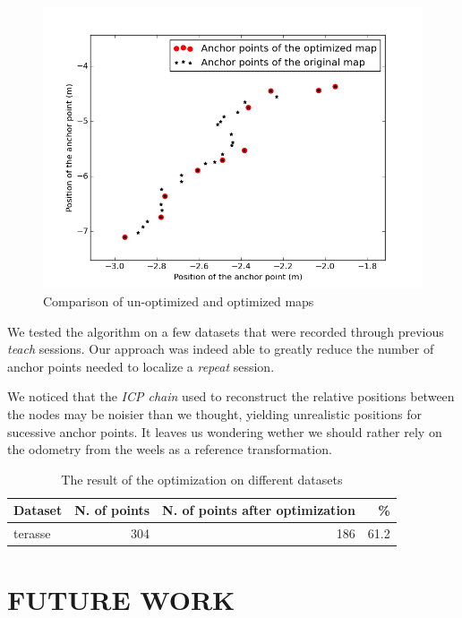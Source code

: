 \documentclass[letterpaper,10 pt,conference]{ieeeconf}
\begin{document}
\begin{figure}
  \centering
  \includegraphics[scale=0.4]{map_optimization}
  \caption{Comparison of un-optimized and optimized maps}
\end{figure}

We tested the algorithm on a few datasets that were recorded through previous \textit{teach}
sessions. Our approach was indeed able to greatly reduce the number of anchor points needed to
localize a \textit{repeat} session.

We noticed that the \textit{ICP chain} used to reconstruct the relative positions between the nodes
may be noisier than we thought, yielding unrealistic positions for sucessive anchor points. It
leaves us wondering wether we should rather rely on the odometry from the weels as a reference
transformation.

\begin{table}[h]
\centering
\begin{tabular}{|l|r|r|r|}
  \hline
Dataset & N. of points & N. of points after optimization & \% \\
\hline
terasse & 304 & 186 & 61.2 \\
  \hline
\end{tabular}
\caption{The result of the optimization on different datasets}

\end{table}

\section{FUTURE WORK}
\end{document}
